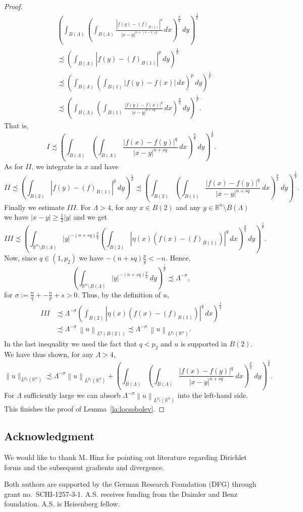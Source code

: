 \documentclass[12pt]{amsart}
\theoremstyle{definition}
\newcommand{\R}{\mathbb{R}}
\newcommand{\brac}[1]{\left (#1 \right )}
\newcommand{\norm}[1]{\left\|{#1}\right\|}
\numberwithin{theorem}{section} \numberwithin{equation}{section}
\newcommand{\aleq}{\precsim}
\begin{document}
\begin{proof}
\[\begin{split}
 &\brac{\int_{B(\Lambda )}\brac{\int_{B(\Lambda )} \frac{|f(y)-(f)_{B(1)}|^q}{|x-y|^{n+(s-1)q}}\, dx}^{\frac{p}{q}}\, dy}^{\frac{1}{p}}\\
 &\aleq \brac{\int_{B(\Lambda )}|f(y)-(f)_{B(1)}|^{p}\, dy}^{\frac{1}{p}}\\ 
 &\aleq \brac{\int_{B(\Lambda )}\brac{\int_{B(1)} |f(y)-f(x)|\,dx }^{p}\,dy}^{\frac{1}{p}}\\
 &\aleq \brac{\int_{B(\Lambda )}\brac{\int_{B(1)} \frac{|f(y)-f(x)|^q}{|x-y|^{n+sq}}\,dx }^{\frac{p}{q}}\,dy}^{\frac{1}{p}}.
 \end{split}
\]
That is, 
\[
 I \aleq  \brac{\int_{B(\Lambda )}\brac{\int_{B(\Lambda )} \frac{|f(x)-f(y)|^q}{|x-y|^{n+sq}}\, dx}^{\frac{p}{q}}\, dy}^{\frac{1}{p}}.
\]
As for $II$, we integrate in $x$ and have
 \[
   II \aleq \brac{\int_{B(2)}|f(y)-(f)_{B(1)}|^{p}\, dy}^{\frac{1}{p}}
  \aleq \brac{\int_{B(2)}\brac{\int_{B(1)} \frac{|f(x)-f(y)|^q}{|x-y|^{n+sq}}\ dx}^\frac{p}{q}\ dy}^\frac{1}{p}.
\]
Finally we estimate $III$. For $\Lambda > 4$, for any $x\in {B(2)}$ and any $y\in \R^n\setminus B(\Lambda)$ we have  $|x-y|\ge \frac{1}{2}|y|$ and we get
\[
III \aleq \brac{\int_{\R^n\setminus B(\Lambda )}|y|^{-(n+sq)\frac{p}{q}}\brac{\int_{{B(2)}} |{\eta(x)}(f(x)-(f)_{{B(1)}})|^q\, dx}^{\frac{p}{q}}\, dy}^{\frac{1}{p}}.
\]
Now, since $q \in (1,p_2)$ we have $-(n+sq)\frac{p}{q} < -n$. Hence,
\[
 \brac{\int_{\R^n\setminus B(\Lambda )}|y|^{-(n+sq)\frac{p}{q}}\ dy}^{\frac{1}{p}} \aleq \Lambda^{-\sigma},
\]
for $\sigma := \frac{n}{q}+-\frac{n}{p}+s >0$. Thus, by the definition of $u$,
\[
\begin{split}
III &\aleq \Lambda^{-\sigma}\brac{\int_{{B(2)}}|{\eta(x)}(f(x)-(f)_{{B(1)}})|^q\, dx}^{\frac1q}\\
&\aleq \Lambda^{-\sigma}\, \norm{u}_{L^q(B(2))}\aleq \Lambda^{-\sigma}\, \norm{u}_{L^{p_2}(\R^n)}.
\end{split}
\]
In the last inequality we used the fact that $q < p_2$ and $u$ is supported in $B(2)$.
We have thus shown, for any $\Lambda > 4$,
\[
\|u\|_{L^{p_2}({\R^n})} \aleq   \Lambda^{-\sigma} \norm{u}_{L^{p_2}(\R^n)} + \brac{\int_{B(\Lambda)}\brac{\int_{B(\Lambda)} \frac{|f(x)-f(y)|^q}{|x-y|^{n+sq}}\ dx}^\frac{p}{q}\ dy}^\frac{1}{p}.
\]
For $\Lambda$ sufficiently large we can absorb $\Lambda^{-\sigma} \norm{u}_{L^{p_2}(\R^n)}$ into the left-hand side. This finishes the proof of Lemma~\ref{la:locsobolev}.
\end{proof}
% 
% 
% 
% 
% 
\subsection*{Acknowledgment}
We would like to thank M. Hinz for pointing out literature regarding Dirichlet forms and the subsequent gradients and divergence.

Both authors are supported by the German Research Foundation (DFG) through grant no.~SCHI-1257-3-1. A.S. receives funding from the Daimler and Benz foundation. A.S. is Heisenberg fellow.  
% 
% 
% 
% 
%
% 
\end{document}
